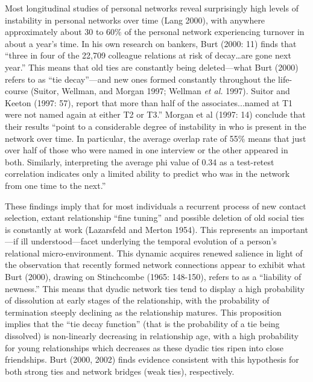 Most longitudinal studies of personal networks reveal surprisingly high levels of instability in personal networks over time (Lang 2000), with anywhere approximately about 30 to 60\% of the personal network experiencing turnover in about a year's time. In his own research on bankers, Burt (2000: 11) finds that ``three in four of the 22,709 colleague relations at risk of decay\ldots are gone next year.'' This means that old ties are constantly being deleted---what Burt (2000) refers to as ``tie decay''---and new ones formed constantly throughout the life-course (Suitor, Wellman, and Morgan 1997; Wellman \emph{et al.} 1997). Suitor and Keeton (1997: 57), report that more than half of the associates...named at T1 were not named again at either T2 or T3.'' Morgan et al (1997: 14) conclude that their results ``point to a considerable degree of instability in who is present in the network over time. In particular, the average overlap rate of 55\% means that just over half of those who were named in one interview or the other appeared in both. Similarly, interpreting the average phi value of 0.34 as a test-retest correlation indicates only a limited ability to predict who was in the network from one time to the next.''

These findings imply that for most individuals a recurrent process of new contact selection, extant relationship ``fine tuning'' and possible deletion of old social ties is constantly at work (Lazarsfeld and Merton 1954). This represents an important---if ill understood---facet underlying the temporal evolution of a person's relational micro-environment. This dynamic acquires renewed salience in light of the observation that recently formed network connections appear to exhibit what Burt (2000), drawing on Stinchcombe (1965: 148-150), refers to as a ``liability of newness.'' This means that dyadic network ties tend to display a high probability of dissolution at early stages of the relationship, with the probability of termination steeply declining as the relationship matures. This proposition implies that the ``tie decay function'' (that is the probability of a tie being dissolved) is non-linearly decreasing in relationship age, with a high probability for young relationships which decreases as these dyadic ties ripen into close friendships. Burt (2000, 2002) finds evidence consistent with this hypothesis for both strong ties and network bridges (weak ties), respectively.

